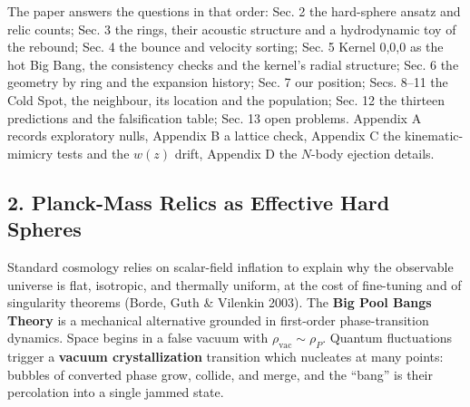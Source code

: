 \documentclass[
  11pt,
]{article}
\begin{document}
The paper answers the questions in that order: Sec. 2 the hard-sphere
ansatz and relic counts; Sec. 3 the rings, their acoustic structure and
a hydrodynamic toy of the rebound; Sec. 4 the bounce and velocity
sorting; Sec. 5 Kernel 0,0,0 as the hot Big Bang, the consistency checks
and the kernel's radial structure; Sec. 6 the geometry by ring and the
expansion history; Sec. 7 our position; Secs. 8--11 the Cold Spot, the
neighbour, its location and the population; Sec. 12 the thirteen
predictions and the falsification table; Sec. 13 open problems. Appendix
A records exploratory nulls, Appendix B a lattice check, Appendix C the
kinematic-mimicry tests and the \(w(z)\) drift, Appendix D the
\(N\)-body ejection details.

\hypertarget{planck-mass-relics-as-effective-hard-spheres}{%
\subsection{\texorpdfstring{\textbf{2. Planck-Mass Relics as Effective
Hard
Spheres}}{2. Planck-Mass Relics as Effective Hard Spheres}}\label{planck-mass-relics-as-effective-hard-spheres}}

Standard cosmology relies on scalar-field inflation to explain why the
observable universe is flat, isotropic, and thermally uniform, at the
cost of fine-tuning and of singularity theorems (Borde, Guth \& Vilenkin
2003). The \textbf{Big Pool Bangs Theory} is a mechanical alternative
grounded in first-order phase-transition dynamics. Space begins in a
false vacuum with \(\rho_{\text{vac}} \sim \rho_P\). Quantum
fluctuations trigger a \textbf{vacuum crystallization} transition which
nucleates at many points: bubbles of converted phase grow, collide, and
merge, and the ``bang'' is their percolation into a single jammed state.
\end{document}
